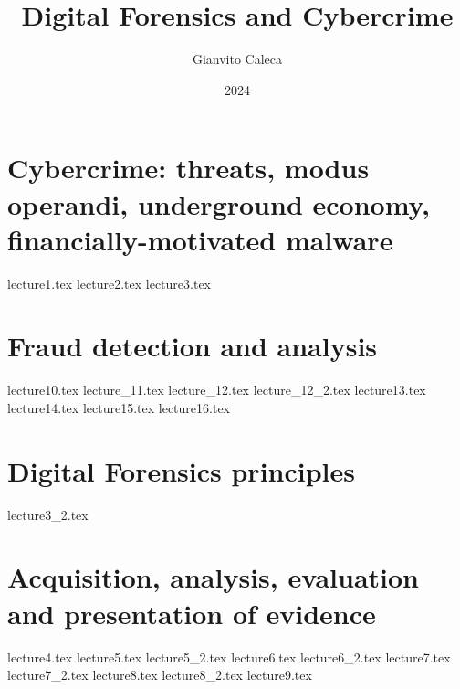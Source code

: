 \documentclass{report}
\title{Digital Forensics and Cybercrime}
\date{2024}
\author{Gianvito Caleca}
\begin{document}
\maketitle
\tableofcontents
\part{Cybercrime: threats, modus operandi, underground economy, financially-motivated malware}
{lecture1.tex}
{lecture2.tex}
{lecture3.tex}
\part{Fraud detection and analysis}
{lecture10.tex}
{lecture_11.tex}
{lecture_12.tex}
{lecture_12_2.tex}
{lecture13.tex}
{lecture14.tex}
{lecture15.tex}
{lecture16.tex}
\part{Digital Forensics principles}
{lecture3_2.tex}
\part{Acquisition, analysis, evaluation and presentation of evidence}
{lecture4.tex}
{lecture5.tex}
{lecture5_2.tex}
{lecture6.tex}
{lecture6_2.tex}
{lecture7.tex}
{lecture7_2.tex}
{lecture8.tex}
{lecture8_2.tex}
{lecture9.tex}
\end{document}
